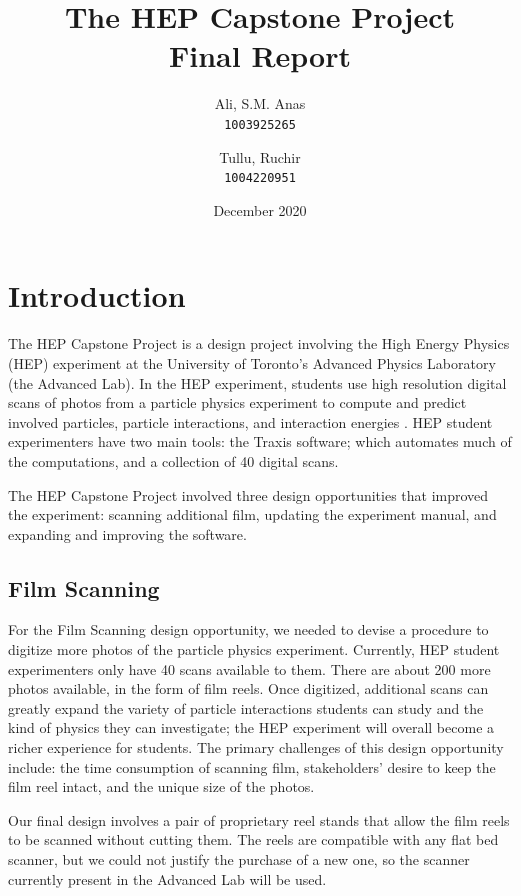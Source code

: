 \documentclass[12pt]{article} %
\title{The HEP Capstone Project \\
    \large Final Report}
\author{
    Ali, S.M. Anas\\
    \texttt{1003925265}
    \and
    Tullu, Ruchir\\
    \texttt{1004220951}}
\date{December 2020}
\begin{document}
\maketitle
\newpage

\tableofcontents
\newpage

\section{Introduction}
The HEP Capstone Project is a design project involving the High Energy Physics (HEP) experiment at the University of Toronto's Advanced Physics Laboratory (the Advanced Lab). In the HEP experiment, students use high resolution digital scans of photos from a particle physics experiment to compute and predict involved particles, particle interactions, and interaction energies \cite{aplhep}. HEP student experimenters have two main tools: the Traxis software; which automates much of the computations, and a collection of 40 digital scans.

The HEP Capstone Project involved three design opportunities that improved the experiment: scanning additional film, updating the experiment manual, and expanding and improving the software.

\subsection{Film Scanning}
For the Film Scanning design opportunity, we needed to devise a procedure to digitize more photos of the particle physics experiment. Currently, HEP student experimenters only have 40 scans available to them. There are about 200 more photos available, in the form of film reels. Once digitized, additional scans can greatly expand the variety of particle interactions students can study and the kind of physics they can investigate; the HEP experiment will overall become a richer experience for students. The primary challenges of this design opportunity include: the time consumption of scanning film, stakeholders' desire to keep the film reel intact, and the unique size of the photos.

Our final design involves a pair of proprietary reel stands that allow the film reels to be scanned without cutting them. The reels are compatible with any flat bed scanner, but we could not justify the purchase of a new one, so the scanner currently present in the Advanced Lab will be used.
\end{document}
